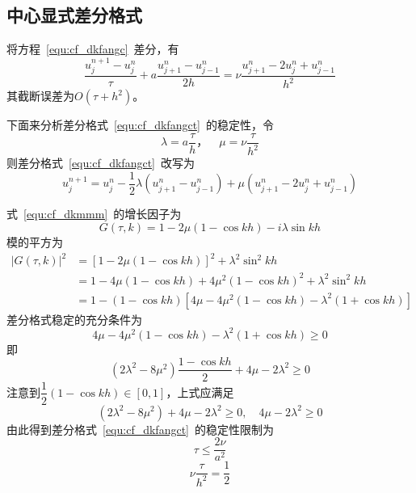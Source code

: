 \subsection{中心显式差分格式}
将方程~\ref{equ:cf_dkfangc}~差分，有
\begin{equation}\label{equ:cf_dkfangct}
	\dfrac{u^{n+1}_j-u^{n}_{j}}{\tau}+a\dfrac{u^{n}_{j+1}-u^n_{j-1}}{2h}=\nu\dfrac{u^n_{j+1}-2u^n_j+u^n_{j-1}}{h^2}
\end{equation}
其截断误差为$O(\tau+h^2)$。\par
下面来分析差分格式~\ref{equ:cf_dkfangct}~的稳定性，令
\begin{equation}
	\lambda = a\dfrac{\tau}{h}，\quad\mu=\nu\dfrac{\tau}{h^2}
\end{equation}
则差分格式~\ref{equ:cf_dkfangct}~改写为
\begin{equation}\label{equ:cf_dkmmm}
u^{n+1}_j=u^n_j-\frac{1}{2}\lambda(u^n_{j+1}-u^n_{j-1})+\mu(u^n_{j+1}-2u^n_j+u^n_{j-1})
\end{equation}\par
式~\ref{equ:cf_dkmmm}~的增长因子为
\begin{equation}
	G(\tau,k)=1-2\mu(1-\cos kh)-i\lambda\sin kh
\end{equation}
模的平方为
\begin{equation}
\begin{aligned}
	|G(\tau,k)|^2 &= [1-2\mu(1-\cos kh)]^2+\lambda^2\sin^2 kh\\
				  &= 1-4\mu(1-\cos kh)+4\mu^2(1-\cos kh)^2+\lambda^2\sin^2 kh\\
				  &= 1-(1-\cos kh)[4\mu-4\mu^2(1-\cos kh)-\lambda^2(1+\cos kh)]
\end{aligned}				  
\end{equation}
差分格式稳定的充分条件为
\begin{equation}
4\mu-4\mu^2(1-\cos kh)-\lambda^2(1+\cos kh) \geq 0
\end{equation}
即
\begin{equation}
(2\lambda^2-8\mu^2)\dfrac{1-\cos kh}{2}+4\mu-2\lambda^2 \geq 0
\end{equation}
注意到$\dfrac{1}{2}(1-\cos kh)\in[0,1]$，上式应满足
\begin{equation}
(2\lambda^2-8\mu^2)+4\mu-2\lambda^2 \geq 0,\quad 4\mu-2\lambda^2 \geq 0
\end{equation}
由此得到差分格式~\ref{equ:cf_dkfangct}~的稳定性限制为
\begin{equation}
\tau \leq \dfrac{2\nu}{a^2}
\end{equation}
\begin{equation}
\nu\dfrac{\tau}{h^2}=\dfrac{1}{2}
\end{equation}\par
